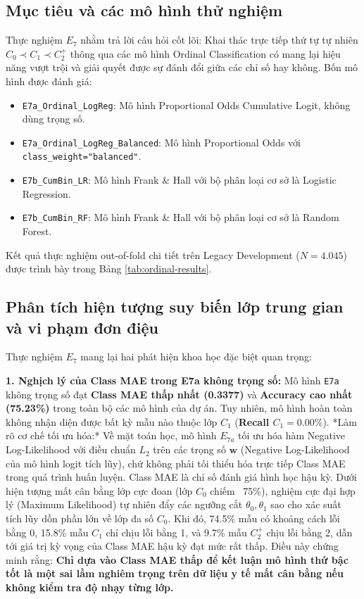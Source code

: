 \subsection{Mục tiêu và các mô hình thử nghiệm}
Thực nghiệm $E_7$ nhằm trả lời câu hỏi cốt lõi: Khai thác trực tiếp thứ tự tự nhiên $C_0 \prec C_1 \prec C_2^+$ thông qua các mô hình Ordinal Classification có mang lại hiệu năng vượt trội và giải quyết được sự đánh đổi giữa các chỉ số hay không. Bốn mô hình được đánh giá:
\begin{itemize}
    \item \texttt{E7a\_Ordinal\_LogReg}: Mô hình Proportional Odds Cumulative Logit, không dùng trọng số.
    \item \texttt{E7a\_Ordinal\_LogReg\_Balanced}: Mô hình Proportional Odds với \texttt{class\_weight="balanced"}.
    \item \texttt{E7b\_CumBin\_LR}: Mô hình Frank \& Hall với bộ phân loại cơ sở là Logistic Regression.
    \item \texttt{E7b\_CumBin\_RF}: Mô hình Frank \& Hall với bộ phân loại cơ sở là Random Forest.
\end{itemize}

Kết quả thực nghiệm out-of-fold chi tiết trên Legacy Development ($N = 4.045$) được trình bày trong Bảng \ref{tab:ordinal-results}.



\subsection{Phân tích hiện tượng suy biến lớp trung gian và vi phạm đơn điệu}
Thực nghiệm $E_7$ mang lại hai phát hiện khoa học đặc biệt quan trọng:

\textbf{1. Nghịch lý của Class MAE trong E7a không trọng số:}  
Mô hình \texttt{E7a} không trọng số đạt \textbf{Class MAE thấp nhất (0.3377)} và \textbf{Accuracy cao nhất (75.23\%)} trong toàn bộ các mô hình của dự án. Tuy nhiên, mô hình hoàn toàn không nhận diện được bất kỳ mẫu nào thuộc lớp $C_1$ (\textbf{Recall $C_1 = 0.00\%$}).  
*Làm rõ cơ chế tối ưu hóa:* Về mặt toán học, mô hình $E_{7a}$ tối ưu hóa hàm Negative Log-Likelihood với điều chuẩn $L_2$ trên các trọng số $\mathbf{w}$ (Negative Log-Likelihood của mô hình logit tích lũy), chứ không phải tối thiểu hóa trực tiếp Class MAE trong quá trình huấn luyện. Class MAE là chỉ số đánh giá hình học hậu kỳ. Dưới hiện tượng mất cân bằng lớp cực đoan (lớp $C_0$ chiếm ~75\%), nghiệm cực đại hợp lý (Maximum Likelihood) tự nhiên đẩy các ngưỡng cắt $\theta_0, \theta_1$ sao cho xác suất tích lũy dồn phần lớn về lớp đa số $C_0$. Khi đó, 74.5\% mẫu có khoảng cách lỗi bằng 0, 15.8\% mẫu $C_1$ chỉ chịu lỗi bằng 1, và 9.7\% mẫu $C_2^+$ chịu lỗi bằng 2, dẫn tới giá trị kỳ vọng của Class MAE hậu kỳ đạt mức rất thấp. Điều này chứng minh rằng: \textbf{Chỉ dựa vào Class MAE thấp để kết luận mô hình thứ bậc tốt là một sai lầm nghiêm trọng trên dữ liệu y tế mất cân bằng nếu không kiểm tra độ nhạy từng lớp.}

